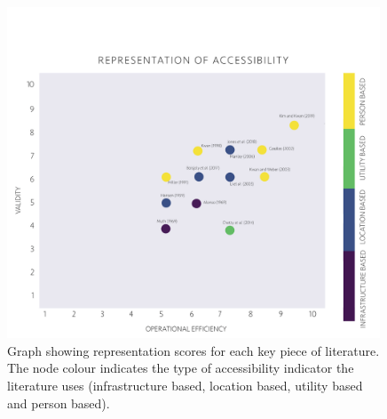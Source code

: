 \documentclass[a4paper,UKenglish]{lipics-v2018}
\begin{document}
\begin{figure}[ht]
    \centering
    \includegraphics[width=0.99\textwidth]{Literature_review/Representation.pdf}
    \caption[Representation scatterplot]{Graph showing representation scores for each key piece of literature. The node colour indicates the type of accessibility indicator the literature uses (infrastructure based, location based, utility based and person based).} 
    \label{fig:Representation}
\end{figure}
\end{document}
